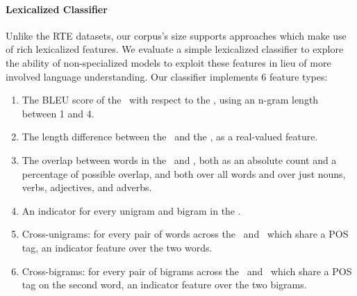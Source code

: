 \paragraph{Lexicalized Classifier}
Unlike the RTE datasets, our corpus's size supports approaches which make use of rich lexicalized features.
We evaluate a simple lexicalized classifier to explore the ability of non-specialized models to exploit these features in lieu of more involved language understanding.
Our classifier implements 6 feature types:
\begin{enumerate}
\setlength\itemsep{-0.25em}
  \item The BLEU score of the \hypothesis\ with respect
  to the \premise, using an n-gram length between 1 and 4.

  \item The length difference between the \hypothesis\ and the \premise, as a real-valued
  feature.

  \item The overlap between words in the \premise\ and \hypothesis,
  both as an absolute count and a percentage of possible overlap, and both over 
  all words and over just nouns, verbs, adjectives, 
  and adverbs.
  
  \item\label{lst:ngram} An indicator for every unigram and bigram in the \hypothesis.

  \item\label{lst:unigram} Cross-unigrams: for every pair of words across the \premise\ and \hypothesis\ which share a 
  POS tag, an indicator feature over the two words.
  
  \item\label{lst:bigram} Cross-bigrams: for every pair of bigrams across the \premise\ and \hypothesis\ which share a 
  POS tag on the second word, an indicator feature over the two bigrams.
\end{enumerate}

%
%

